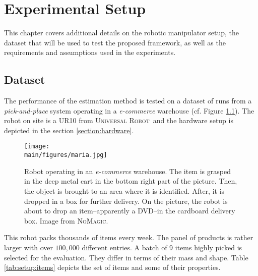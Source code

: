 \documentclass[/home/francois/latex/report/main.tex]{subfiles}
\begin{document}
\chapter{Experimental Setup}
\label{chapter:setup}

This chapter covers additional details on the robotic manipulator setup, the dataset that will be used to test the proposed framework, as well as the requirements and assumptions used in the experiments.

\section{Dataset}

The performance of the estimation method is tested on a dataset of runs from a \textit{pick-and-place} system operating in a \textit{e-commerce} warehouse (cf. Figure \ref{fig:setup:maria}). The robot on site is a UR10 from \textsc{Universal Robot}\texttrademark \ and the hardware setup is depicted in the section \ref{section:hardware}.

\begin{figure}[h]
  \centering
  \texttt{[image: \\main/figures/maria.jpg]}
  \caption{Robot operating in an \textit{e-commerce} warehouse. The item is grasped in the deep metal cart in the bottom right part of the picture. Then, the object is brought to an area where it is identified. After, it is dropped in a box for further delivery. On the picture, the robot is about to drop an item–apparently a DVD–in the cardboard delivery box. Image from \textsc{NoMagic}.}
  \label{fig:setup:maria}
\end{figure}

This robot packs thousands of items every week. The panel of products is rather larger with over $100{,}000$ different entries. A batch of 9 items highly picked is selected for the evaluation. They differ in terms of their mass and shape. Table \ref{tab:setup:items} depicts the set of items and some of their  properties.
\end{document}
